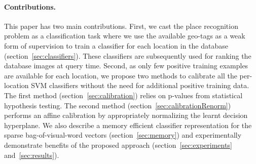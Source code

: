 \paragraph{Contributions.} 
  This paper has two main contributions. \textcolor{petr}{First, we cast the place recognition problem as a classification task where we use the available geo-tags as a weak form of supervision to train a classifier for each location in the database (section~\ref{sec:classifiers})}. 
  \textcolor{petr}{
    These classifiers are subsequently used for ranking the database images at query time.
  } 
  Second, as only few positive training examples are available for each location, we propose two methods to calibrate all the per-location SVM classifiers without the need for additional positive training data. The first method (section~\ref{sec:calibration}) relies on p-values from statistical hypothesis testing. The second method (section~\ref{sec:calibrationRenorm}) performs an affine calibration by appropriately normalizing the learnt decision hyperplane. 
  We also describe a memory efficient classifier representation for the sparse bag-of-visual-word vectors (section~\ref{sec:memory}) and  experimentally demonstrate benefits of the proposed approach (section~\ref{sec:experiments} and~\ref{sec:results}).  


